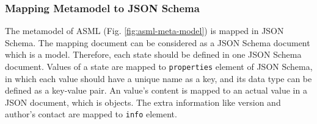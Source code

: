 \subsubsection{Mapping Metamodel to JSON Schema}
The metamodel of ASML (Fig. \ref{fig:asml-meta-model}) is mapped in JSON Schema. The mapping document can be considered as a JSON Schema document which is a model. Therefore, each state should be defined in one JSON Schema document. Values of a state are mapped to \lstinline[basicstyle=\ttfamily]{properties} element of JSON Schema, in which each value should have a unique name as a key, and its data type can be defined as a key-value pair. An value’s content is mapped to an actual value in a JSON document, which is objects. The extra information like version and author’s contact are mapped to \lstinline[basicstyle=\ttfamily]{info} element.



